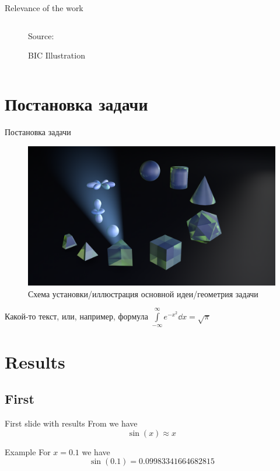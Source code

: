 \documentclass[
aspectratio=169,
16pt,
xcolor={dvipsnames} %
]{beamer}
\begin{document}
\begin{frame}[t]{Relevance of the work}
\begin{columns}
\begin{column}{0.4\linewidth}
\begin{figure}
				\caption{BIC Illustration}
				 {\raggedright\tiny Source:\par}
			\end{figure}
		\end{column}
	\end{columns}
\end{frame}

\section{Постановка задачи}
\begin{frame}[t]{Постановка задачи}
	\begin{figure}
      
				\includegraphics[width=0.4\linewidth]{fig/scheme.png}
				\caption{Схема установки/иллюстрация основной идеи/геометрия задачи~}
	\end{figure}
	Какой-то текст, или, например, формула $\int\limits_{-\infty}^\infty  e^{-x^2} \dd x=\sqrt\pi$
\end{frame}



\section{Results}
\subsection{First}
\begin{frame}[t]{First slide with results}
	From  we have
	\[
		\sin(x) \approx x
	\]
	\begin{block}{Example}
		For $x = 0.1$ we have 
		\[
			\sin (0.1) = 0.09983341664682815
		\]
	\end{block}
\end{frame}
\end{document}
